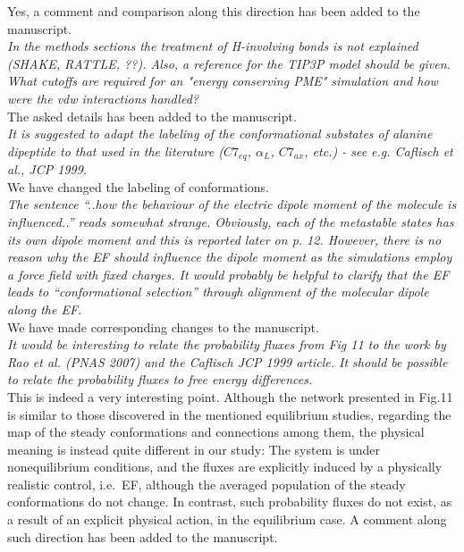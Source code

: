 \documentclass[]{revtex4-1}
\begin{document}
Yes, a comment and comparison along this direction has been added to the
manuscript.\\

\emph{ In the methods sections the treatment of H-involving bonds is
  not explained (SHAKE, RATTLE, ??). Also, a reference for the TIP3P
  model should be given. What cutoffs are required for an "energy
  conserving PME" simulation and how were the vdw interactions
  handled?  }\\

The asked details has been added to the manuscript.\\

\emph{
It is suggested to adapt the labeling of the conformational substates
of alanine dipeptide to that used in the literature ($C7_{eq}$, $\alpha_L$,
$C7_{ax}$, etc.) - see e.g. Caflisch et al., JCP 1999.
}\\

We have changed the labeling of conformations.\\

\emph{
The sentence ``..how the behaviour of the electric dipole moment of the
molecule is influenced..'' reads somewhat strange. Obviously, each of
the metastable states has its own dipole moment and this is reported
later on p. 12. However, there is no reason why the EF should
\emph{influence} the dipole moment as the simulations employ a force field
with fixed charges. It would probably be helpful to clarify that the
EF leads to ``conformational selection'' through alignment of the
molecular dipole along the EF.
}\\

We have made corresponding changes to the manuscript.\\

\emph{ It would be interesting to relate the probability fluxes from
  Fig 11 to the work by Rao et al. (PNAS 2007) and the Caflisch JCP
  1999 article. It should be possible to relate the probability fluxes
  to free energy differences.}\\

This is indeed a very interesting point.
Although the network presented in Fig.11 is similar to those
discovered in the mentioned equilibrium studies,
regarding the map of the steady conformations and connections among them,
the physical meaning is instead quite different in our study:
The system is under nonequilibrium conditions, and
the fluxes are explicitly induced by a physically realistic control, i.e.~EF, although the averaged population of the steady conformations do not change. In contrast,
such probability fluxes do not exist, as a result of an explicit physical action, in the equilibrium case.
A comment along such direction has been added to the
manuscript.\\

\end{document}
